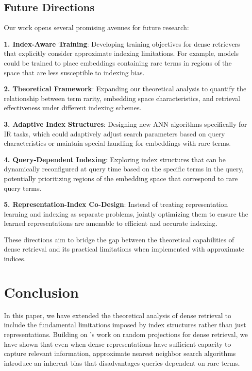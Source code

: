 \documentclass[sigconf,review]{acmart}
\begin{document}
\subsection{Future Directions}
Our work opens several promising avenues for future research:

\textbf{1. Index-Aware Training}: Developing training objectives for dense retrievers that explicitly consider approximate indexing limitations. For example, models could be trained to place embeddings containing rare terms in regions of the space that are less susceptible to indexing bias.

\textbf{2. Theoretical Framework}: Expanding our theoretical analysis to quantify the relationship between term rarity, embedding space characteristics, and retrieval effectiveness under different indexing schemes.

\textbf{3. Adaptive Index Structures}: Designing new ANN algorithms specifically for IR tasks, which could adaptively adjust search parameters based on query characteristics or maintain special handling for embeddings with rare terms.

\textbf{4. Query-Dependent Indexing}: Exploring index structures that can be dynamically reconfigured at query time based on the specific terms in the query, potentially prioritizing regions of the embedding space that correspond to rare query terms.

\textbf{5. Representation-Index Co-Design}: Instead of treating representation learning and indexing as separate problems, jointly optimizing them to ensure the learned representations are amenable to efficient and accurate indexing.

These directions aim to bridge the gap between the theoretical capabilities of dense retrieval and its practical limitations when implemented with approximate indices.

\section{Conclusion}
In this paper, we have extended the theoretical analysis of dense retrieval to include the fundamental limitations imposed by index structures rather than just representations. Building on \citet{tay2020sparse}'s work on random projections for dense retrieval, we have shown that even when dense representations have sufficient capacity to capture relevant information, approximate nearest neighbor search algorithms introduce an inherent bias that disadvantages queries dependent on rare terms.
\end{document}
